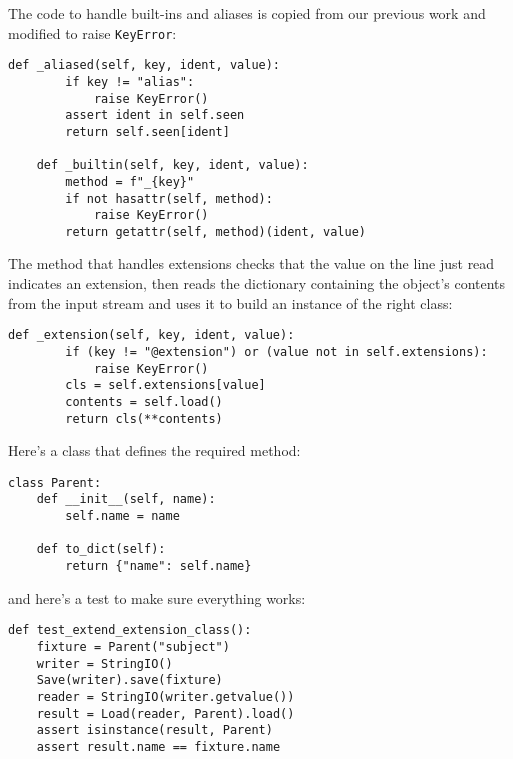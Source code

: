 \documentclass{scrbook}
\begin{document}
The code to handle built-ins and aliases is copied from our previous work
and modified to raise \texttt{KeyError}:


\begin{lstlisting}[frame=single,frameround=tttt]
    def _aliased(self, key, ident, value):
        if key != "alias":
            raise KeyError()
        assert ident in self.seen
        return self.seen[ident]

    def _builtin(self, key, ident, value):
        method = f"_{key}"
        if not hasattr(self, method):
            raise KeyError()
        return getattr(self, method)(ident, value)
\end{lstlisting}



The method that handles extensions
checks that the value on the line just read indicates an extension,
then reads the dictionary containing the object's contents
from the input stream
and uses it to build an instance of the right class:


\begin{lstlisting}[frame=single,frameround=tttt]
    def _extension(self, key, ident, value):
        if (key != "@extension") or (value not in self.extensions):
            raise KeyError()
        cls = self.extensions[value]
        contents = self.load()
        return cls(**contents)
\end{lstlisting}



Here's a class that defines the required method:


\begin{lstlisting}[frame=single,frameround=tttt]
class Parent:
    def __init__(self, name):
        self.name = name

    def to_dict(self):
        return {"name": self.name}
\end{lstlisting}



and here's a test to make sure everything works:


\begin{lstlisting}[frame=single,frameround=tttt]
def test_extend_extension_class():
    fixture = Parent("subject")
    writer = StringIO()
    Save(writer).save(fixture)
    reader = StringIO(writer.getvalue())
    result = Load(reader, Parent).load()
    assert isinstance(result, Parent)
    assert result.name == fixture.name
\end{lstlisting}
\end{document}
